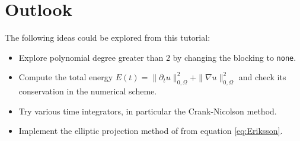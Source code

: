 \documentclass[a4paper,12pt]{article}
\theoremstyle{definition}
\theoremstyle{definition}
\begin{document}

\section{Outlook}

The following ideas could be explored from this tutorial:
\begin{itemize}
\item Explore polynomial degree greater than $2$ by changing the blocking
to \lstinline{none}.
\item Compute the total energy $E(t) = \|\partial_t u\|_{0,\Omega}^2 +
  \|\nabla u\|_{0,\Omega}^2$ and check its conservation in
the numerical scheme.
\item Try various time integrators, in particular the Crank-Nicolson method.
\item Implement the elliptic projection method of \cite{Eriksson} from
equation \eqref{eq:Eriksson}.
\end{itemize}



\end{document}
